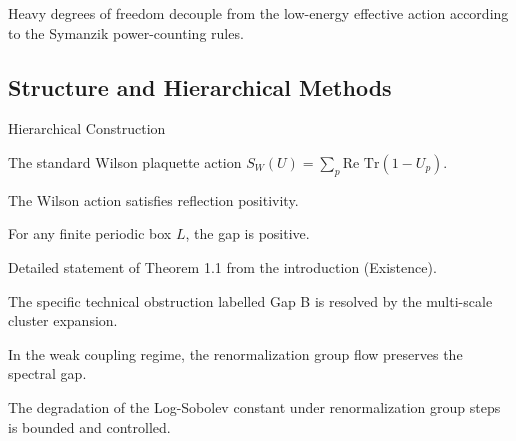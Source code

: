 \begin{proposition}[Decoupling]
\label{prop:decoupling-rigorous}
Heavy degrees of freedom decouple from the low-energy effective action according to the Symanzik power-counting rules.
\end{proposition}

\subsection{Structure and Hierarchical Methods}

\begin{subsection}{Hierarchical Construction}
\label{subsec:hierarchical}
\end{subsection}

\begin{definition}
\label{def:wilson_action}
The standard Wilson plaquette action $S_W(U) = \sum_p \text{Re Tr}(1 - U_p)$.
\end{definition}

\begin{theorem}
\label{thm:rp_wilson}
The Wilson action satisfies reflection positivity.
\end{theorem}

\begin{theorem}
\label{thm:finite_volume_gap}
For any finite periodic box $L$, the gap is positive.
\end{theorem}

\begin{theorem}
\label{thm:1.1}
Detailed statement of Theorem 1.1 from the introduction (Existence).
\end{theorem}

\begin{corollary}
\label{cor:gap-b-resolved}
The specific technical obstruction labelled Gap B is resolved by the multi-scale cluster expansion.
\end{corollary}

\begin{theorem}
\label{thm:weak-coupling-gap}
In the weak coupling regime, the renormalization group flow preserves the spectral gap.
\end{theorem}

\begin{theorem}
\label{thm:rg-degradation}
The degradation of the Log-Sobolev constant under renormalization group steps is bounded and controlled.
\end{theorem}

